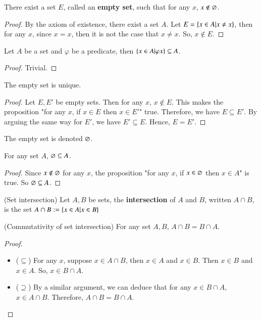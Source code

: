 \begin{thm}
    There exist a set $E$, called an \textbf{empty set}, such that for any $x$, $x\not\in \varnothing$. 
\end{thm}
\begin{proof}
    By the axiom of existence, there exist a set $A$. Let $E = \{x\in A|x\neq x\}$, then for any $x$, since $x=x$, then it is not the case that $x\neq x$. So, $x\not\in E$.
\end{proof}
\begin{prop}
    Let $A$ be a set and $\varphi$ be a predicate, then $\{x\in A|\varphi x\}\subseteq A$.
\end{prop}
\begin{proof}
    Trivial.
\end{proof}
\begin{prop}
    The empty set is unique. 
\end{prop}
\begin{proof}
    Let $E,E'$ be empty sets. Then for any $x$, $x\not\in E$. This makes the proposition "for any $x$, if $x\in E$ then $x\in E'$" true. Therefore, we have $E\subseteq E'$. By arguing the same way for $E'$, we have $E'\subseteq E$. Hence, $E= E'$.
\end{proof}
\begin{rem}
    The empty set is denoted $\varnothing$.
\end{rem}
\begin{prop}
    For any set $A$, $\varnothing\subseteq A$.
\end{prop}
\begin{proof}
    Since $x\not\in\varnothing$ for any $x$, the proposition "for any $x$, if $x\in \varnothing$ then $x\in A$" is true. So $\varnothing\subseteq A$.
\end{proof}
\begin{defn}
    (Set intersection) Let $A,B$ be sets, the \textbf{intersection} of $A$ and $B$, written $A\cap B$, is the set $A\cap B:= \{x\in A|x\in B\}$
\end{defn}
\begin{prop}
    (Commutativity of set intersection) For any set $A,B$, $A\cap B = B\cap A$.
\end{prop}
\begin{proof}
    ~
    \begin{itemize}
        \item ($\subseteq$) For any $x$, suppose $x\in A\cap B$, then $x\in A$ and $x\in B$. Then $x\in B$ and $x\in A$. So, $x\in B\cap A$.
        \item ($\supseteq$) By a similar argument, we can deduce that for any $x\in B\cap A$, $x\in A\cap B$.
        Therefore, $A\cap B = B\cap A$.
    \end{itemize}
\end{proof}
